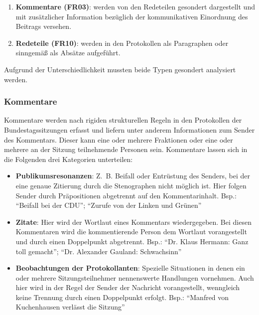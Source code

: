\begin{enumerate}
    \item \textbf{Kommentare (FR03)}: werden von den Redeteilen gesondert
    dargestellt und mit zusätzlicher Information bezüglich der
    kommunikativen Einordnung des Beitrags versehen.
    \item \textbf{Redeteile (FR10)}: werden in den Protokollen als
    Paragraphen oder sinngemäß als Absätze aufgeführt.
\end{enumerate}

Aufgrund der Unterschiedlichkeit mussten beide Typen gesondert analysiert werden.

\subsubsection{Kommentare}

Kommentare werden nach rigiden strukturellen Regeln in den Protokollen der
Bundestagssitzungen erfasst und liefern unter anderem Informationen zum
Sender des Kommentars. Dieser kann eine oder mehrere Fraktionen oder eine
oder mehrere an der Sitzung teilnehmende Personen sein. Kommentare lassen sich
in die Folgenden drei Kategorien unterteilen:

\begin{itemize}
    \item \textbf{Publikumsresonanzen}: Z.~B. Beifall oder Entrüstung des
    Senders, bei der eine genaue Zitierung durch die Stenographen nicht
    möglich ist. Hier folgen Sender durch Präpositionen abgetrennt auf
    den Kommentarinhalt. Bsp.: \enquote{Beifall bei der CDU};
    \enquote{Zurufe von der Linken und Grünen}

    \item \textbf{Zitate}: Hier wird der Wortlaut eines Kommentars
    wiedergegeben. Bei diesen Kommentaren wird die kommentierende Person
    dem Wortlaut vorangestellt und durch einen Doppelpunkt abgetrennt.
    Bsp.: \enquote{Dr. Klaus Hermann: Ganz toll gemacht}; \enquote{Dr.
    Alexander Gauland: Schwachsinn}

    \item \textbf{Beobachtungen der Protokollanten}: Spezielle Situationen in
    denen ein oder mehrere Sitzungsteilnehmer nennenswerte Handlungen
    vornehmen. Auch hier wird in der Regel der Sender der Nachricht
    vorangestellt, wenngleich keine Trennung durch einen Doppelpunkt
    erfolgt. Bsp.: \enquote{Manfred von Kuchenhausen verlässt die Sitzung}

\end{itemize}

